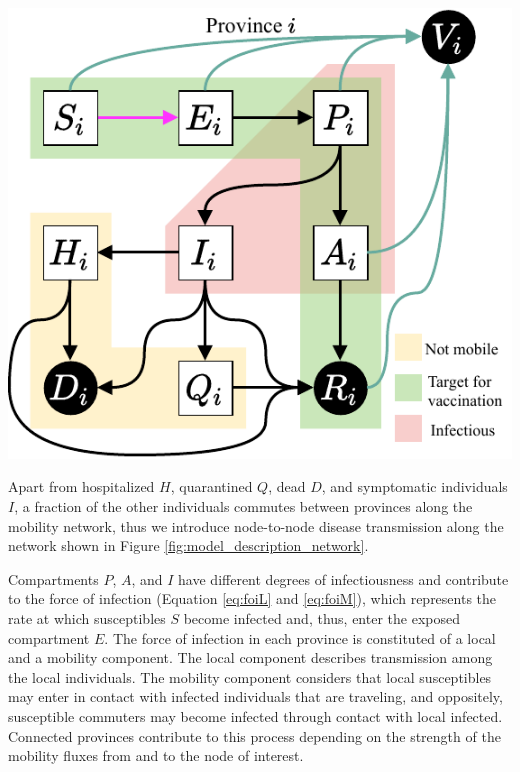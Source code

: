 \begin{marginfigure}
\centering
\includegraphics{fig_italy-ocp/figures/OCPItalydrawio2.pdf}
    \label{fig:model_description_diag}
\end{marginfigure}


Apart from hospitalized $H$, quarantined $Q$, dead $D$, and symptomatic individuals $I$, a fraction of the other individuals commutes between provinces along the mobility network, thus we introduce node-to-node disease transmission along the network shown in Figure \ref{fig:model_description_network}.

Compartments $P$, $A$, and $I$ have different degrees of infectiousness and contribute to the force of infection (Equation \eqref{eq:foiL} and \eqref{eq:foiM}), which represents the rate at which susceptibles $S$ become infected and, thus, enter the exposed compartment $E$. The force of infection in each province is constituted of a local and a mobility component. The local component describes transmission among the local individuals. The mobility component considers that local susceptibles may enter in contact with infected individuals that are traveling, and oppositely, susceptible commuters may become infected through contact with local infected. Connected provinces contribute to this process depending on the strength of the mobility fluxes from and to the node of interest.

